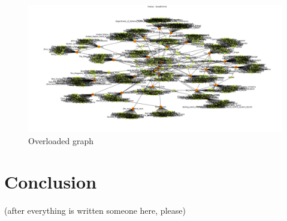 \documentclass[10pt]{article}
\begin{document}
	\begin{figure}[htb]	
			\includegraphics[width=\textwidth]{figure3.png}
   			  	\centering
  			  	\caption{Overloaded graph}
		\end{figure}

	
	
\section{Conclusion}

(after everything is written someone here, please)



\newpage
 

\end{document}
